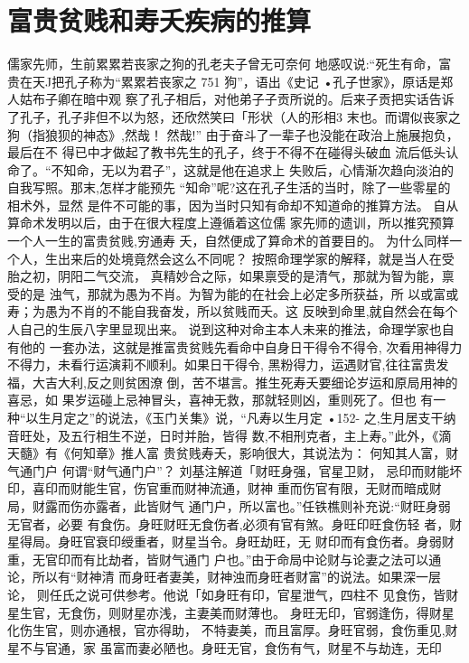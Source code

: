 \section{富贵贫贱和寿夭疾病的推算}
儒家先师，生前累累若丧家之狗的孔老夫子曾无可奈何
地感叹说:“死生有命，富贵在天J把孔子称为“累累若丧家之
751
狗”，语出《史记 •孔子世家》，原话是郑人姑布子卿在暗中观
察了孔子相后，对他弟子子贡所说的。后来子贡把实话告诉
了孔子，孔子非但不以为怒，还欣然笑曰「形状（人的形相3
末也。而谓似丧家之狗（指狼狈的神态》,然哉！ 然哉!”
由于奋斗了一辈子也没能在政治上施展抱负，最后在不
得已中才做起了教书先生的孔子，终于不得不在碰得头破血
流后低头认命了。“不知命，无以为君子”，这就是他在追求上
失败后，心情渐次趋向淡泊的自我写照。那末,怎样才能预先
“知命”呢?这在孔子生活的当时，除了一些零星的相术外，显然
是件不可能的事，因为当时只知有命却不知道命的推算方法。
自从算命术发明以后，由于在很大程度上遵循着这位儒
家先师的遗训，所以推究预算一个人一生的富贵贫贱,穷通寿
夭，自然便成了算命术的首要目的。
为什么同样一个人，生出来后的处境竟然会这么不同呢？
按照命理学家的解释，就是当人在受胎之初，阴阳二气交流，
真精妙合之际，如果禀受的是清气，那就为智为能，禀受的是
浊气，那就为愚为不肖。为智为能的在社会上必定多所获益，所
以或富或寿；为愚为不肖的不能自我奋发，所以贫贱而夭。这
反映到命里,就自然会在每个人自己的生辰八字里显现出来。
说到这种对命主本人未来的推法，命理学家也自有他的
一套办法，这就是推富贵贫贱先看命中自身日干得令不得令,
次看用神得力不得力，未看行运演莉不顺利。如果日干得令,
黑粉得力，运遇财官,往往富贵发福，大吉大利,反之则贫困潦
倒，苦不堪言。推生死寿夭要细论岁运和原局用神的喜忌，如
果岁运碰上忌神冒头，喜神无救，那就轻则凶，重则死了。但也
有一种“以生月定之”的说法，《玉门关集》说，“凡寿以生月定
•152-
之,生月居支干纳音旺处，及五行相生不逆，日时并胎，皆得
数,不相刑克者，主上寿。”此外，《滴天髓》有《何知章》推人富
贵贫贱寿夭，影响很大，其说法为：
何知其人富，财气通门户
何谓“财气通门户”？ 刘基注解道「财旺身强，官星卫财，
忌印而财能坏印，喜印而财能生官，伤官重而财神流通，财神
重而伤官有限，无财而暗成财局，财露而伤亦露者，此皆财气
通门户，所以富也。”任铁樵则补充说:“财旺身弱无官者，必要
有食伤。身旺财旺无食伤者,必须有官有煞。身旺印旺食伤轻
者，财星得局。身旺官衰印绶重者，财星当令。身旺劫旺，无
财印而有食伤者。身弱财重，无官印而有比劫者，皆财气通门
户也。”由于命局中论财与论妻之法可以通论，所以有“财神清
而身旺者妻美，财神浊而身旺者财富”的说法。如果深一层论，
则任氏之说可供参考。他说「如身旺有印，官星泄气，四柱不
见食伤，皆财星生官，无食伤，则财星亦浅，主妻美而财薄也。
身旺无印，官弱逢伤，得财星化伤生官，则亦通根，官亦得助，
不特妻美，而且富厚。身旺官弱，食伤重见,财星不与官通，家
虽富而妻必陋也。身旺无官，食伤有气，财星不与劫连，无印
